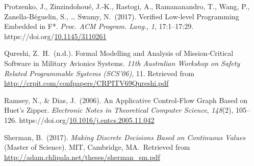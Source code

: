 \documentclass[12pt,twoside]{article}
\begin{document}
{\begin{thebibliography}{222}
\mdbibitemlabel{[Protzenko et al., 2017]}Protzenko, J., Zinzindohoué, J.-K., Rastogi, A., Ramananandro, T., Wang, P., Zanella-Béguelin, S., … Swamy, N.~(2017). Verified Low-level Programming Embedded in F*. \emph{Proc. ACM Program. Lang.}, \emph{1}, 17:1–17:29. https://doi.org/\href{https://dx.doi.org/10.1145/3110261}{10.1145/3110261}\label{protzenko_verified_2017}%

\mdbibitemlabel{[Qureshi, n.d.]}Qureshi, Z.~H.~(n.d.). Formal Modelling and Analysis of Mission-Critical Software in Military Avionics Systems. \emph{11th Australian Workshop on Safety Related Programmable Systems (SCS’06)}, 11. Retrieved from \href{http://crpit.com/confpapers/CRPITV69Qureshi.pdf}{{\ttfamily http://\hspace{0pt}crpit.\hspace{0pt}com/\hspace{0pt}confpapers/\hspace{0pt}CRPITV69Qureshi.\hspace{0pt}pdf}}\label{qureshi_formal_nodate}%

Ramsey, N., \& Dias, J.~(2006). An Applicative Control-Flow Graph Based on Huet’s Zipper. \emph{Electronic Notes in Theoretical Computer Science}, \emph{148}(2), 105–126. https://doi.org/\href{https://dx.doi.org/10.1016/j.entcs.2005.11.042}{10.1016/j.entcs.2005.11.042}\label{ramsey_applicative_2006}%

\mdbibitemlabel{[Sherman, 2017]}Sherman, B.~(2017). \emph{Making Discrete Decisions Based on Continuous Values} (Master of Science). MIT, Cambridge, MA.~Retrieved from \href{http://adam.chlipala.net/theses/sherman_sm.pdf}{{\ttfamily http://\hspace{0pt}adam.\hspace{0pt}chlipala.\hspace{0pt}net/\hspace{0pt}theses/\hspace{0pt}sherman\_\hspace{0pt}sm.\hspace{0pt}pdf}}\label{sherman_making_2017}%


\end{thebibliography}}
\end{document}
